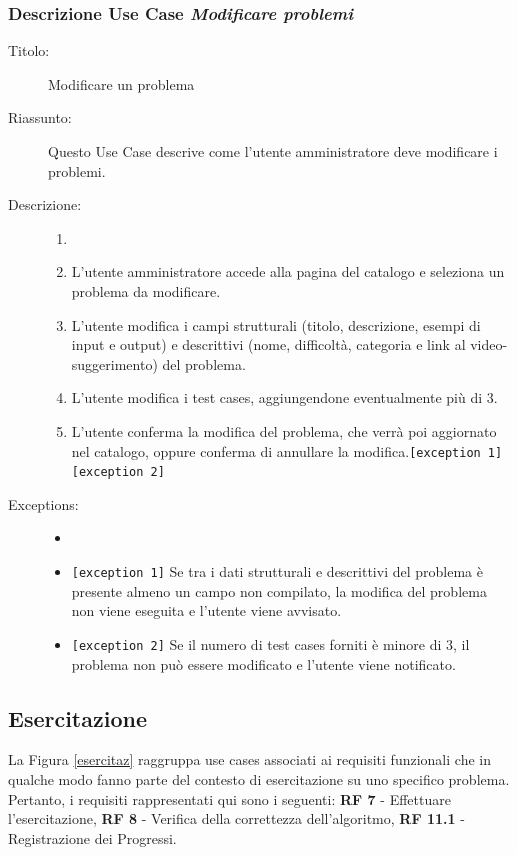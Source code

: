 \documentclass[11pt, a4paper]{article}
\theoremstyle{definition} %
\begin{document}
\subsubsection*{Descrizione Use Case \textit{Modificare problemi}}
\begin{description}
    \item[Titolo:] Modificare un problema
    
    \item[Riassunto:] Questo Use Case descrive come l'utente amministratore
    deve modificare i problemi.

    \item[Descrizione:]
    \begin{enumerate}
        \item[]
        \item L'utente amministratore accede alla pagina del catalogo e seleziona un problema da modificare.
        \item L'utente modifica i campi strutturali (titolo, descrizione, esempi di input e output) e descrittivi (nome, difficoltà, categoria e link al video-suggerimento) del problema.
        \item L'utente modifica i test cases, aggiungendone eventualmente più di 3.
        \item L'utente conferma la modifica del problema, che verrà poi aggiornato nel catalogo, oppure conferma di annullare la modifica.\texttt{[exception 1]} \texttt{[exception 2]}
    \end{enumerate}
    
    \item[Exceptions:]
    \begin{itemize}
        \item[]
        \item \texttt{[exception 1]} Se tra i dati strutturali e descrittivi del problema è presente almeno un campo non compilato, la modifica del problema non viene eseguita e l'utente viene avvisato.
        \item \texttt{[exception 2]} Se il numero di test cases forniti è minore di 3, il problema non può essere modificato e l'utente viene notificato.
    \end{itemize}
\end{description}

\newpage
\subsection{Esercitazione}
La Figura \ref{esercitaz} raggruppa use cases associati ai requisiti funzionali
che in qualche modo fanno parte del contesto di esercitazione su uno specifico problema. Pertanto,
i requisiti rappresentati qui sono i seguenti: \textbf{RF 7} - Effettuare l'esercitazione,
\textbf{RF 8} - Verifica della correttezza dell'algoritmo, \textbf{RF 11.1} - Registrazione dei
Progressi.
\end{document}
